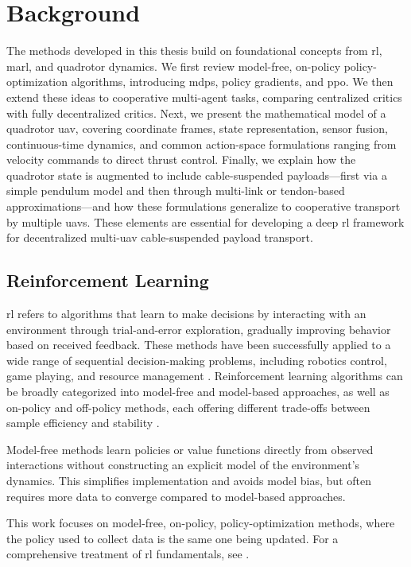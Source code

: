 \chapter{Background}
The methods developed in this thesis build on foundational concepts from \gls{rl}, \gls{marl}, and quadrotor dynamics. We first review model-free, on-policy policy-optimization algorithms, introducing \gls{mdp}s, policy gradients, and \gls{ppo}. We then extend these ideas to cooperative multi-agent tasks, comparing centralized critics with fully decentralized critics. Next, we present the mathematical model of a quadrotor \gls{uav}, covering coordinate frames, state representation, sensor fusion, continuous-time dynamics, and common action-space formulations ranging from velocity commands to direct thrust control. Finally, we explain how the quadrotor state is augmented to include cable-suspended payloads—first via a simple pendulum model and then through multi-link or tendon-based approximations—and how these formulations generalize to cooperative transport by multiple \glspl{uav}. These elements are essential for developing a deep \gls{rl} framework for decentralized multi-\gls{uav} cable-suspended payload transport.

\section{Reinforcement Learning}
\gls{rl} refers to algorithms that learn to make decisions by interacting with an environment through trial-and-error exploration, gradually improving behavior based on received feedback. These methods have been successfully applied to a wide range of sequential decision-making problems, including robotics control, game playing, and resource management \cite{mnih2015human}. Reinforcement learning algorithms can be broadly categorized into model-free and model-based approaches, as well as on-policy and off-policy methods, each offering different trade-offs between sample efficiency and stability \cite{Schulman2015TrustRP}.  

Model-free methods learn policies or value functions directly from observed interactions without constructing an explicit model of the environment's dynamics. This simplifies implementation and avoids model bias, but often requires more data to converge compared to model-based approaches.  

This work focuses on model-free, on-policy, policy-optimization methods, where the policy used to collect data is the same one being updated. For a comprehensive treatment of \gls{rl} fundamentals, see \cite{SuttonBarto2018}.  
